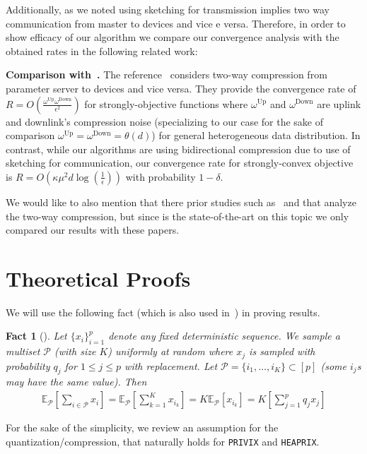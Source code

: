 \documentclass[11pt]{article}
\newtheorem{fact}[theorem]{Fact}
\begin{document}
Additionally, as we noted using sketching for transmission implies two way communication from master to devices and vice e versa. Therefore, in order to show efficacy of our algorithm we compare our convergence analysis with the obtained rates in the following related work:

\textbf{Comparison with~\cite{philippenko2020artemis}.} 
The reference~\citep{philippenko2020artemis} considers two-way compression from parameter server to devices and vice versa. They provide the convergence rate of $R=O\left(\frac{\omega^{\text{Up}}\omega^{\text{Down}}}{\epsilon^2}\right)$ for strongly-objective functions where $\omega^{\text{Up}}$ and $\omega^{\text{Down}}$ are uplink and downlink's compression noise (specializing to our case for the sake of comparison $\omega^{\text{Up}}=\omega^{\text{Down}}=\theta\left(d\right)$) for general heterogeneous data distribution. In contrast, while our algorithms are using bidirectional compression due to use of sketching for communication, our convergence rate for strongly-convex objective is $R=O(\kappa\mu^2d\log\left(\frac{1}{\epsilon}\right))$ with probability $1-\delta$.  

We would like to also mention that there prior studies such as~ \cite{tang2019doublesqueeze} and \cite{zheng2019communication} that analyze the two-way compression, but since \cite{philippenko2020artemis} is the state-of-the-art on this topic we only compared our results with these papers.


\clearpage

\section{Theoretical Proofs}\label{app:proofs}



We will use the following fact (which is also used in~\cite{li2019convergence,haddadpour2019convergence}) in proving results.
\begin{fact}[\cite{li2019convergence,haddadpour2019convergence}]\label{fact:1}
Let
$\{x_i\}_{i=1}^p$ denote any fixed deterministic sequence. We sample a multiset $\mathcal{P}$ (with size $K$) uniformly at random where $x_j$ is sampled  with probability $q_j$ for $1\leq j\leq p$ with replacement.  Let $\mathcal{P} = \{i_1,\ldots, i_K\} \subset[p]$ (some $i_j$s may have the same value). Then
\begin{align}
    \mathbb{E}_{\mathcal{P}}\left[\sum_{i\in \mathcal{P}}x_i\right]=\mathbb{E}_{\mathcal{P}}\left[\sum_{k=1}^Kx_{i_k}\right]=K\mathbb{E}_{\mathcal{P}}\left[x_{i_k}\right]=K\left[\sum_{j=1}^pq_jx_j\right]
\end{align}
\end{fact}
For the sake of the simplicity, we review an assumption for the quantization/compression, that naturally holds for \texttt{PRIVIX} and \texttt{HEAPRIX}.
\end{document}
